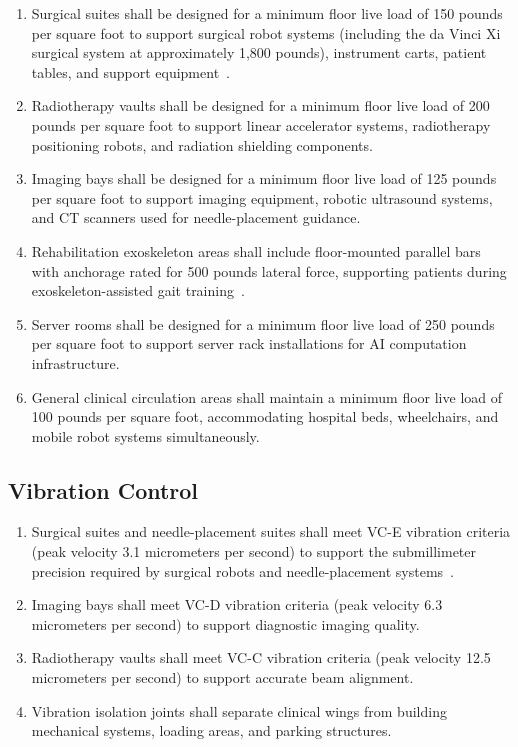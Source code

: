 \begin{enumerate}[label=(\alph*)]
\item Surgical suites shall be designed for a minimum floor live load of 150
  pounds per square foot to support surgical robot systems (including the
  da Vinci Xi surgical system at approximately 1,800 pounds), instrument carts,
  patient tables, and support equipment~\cite{patientinstructions2026}.

\item Radiotherapy vaults shall be designed for a minimum floor live load of
  200 pounds per square foot to support linear accelerator systems,
  radiotherapy positioning robots, and radiation shielding components.

\item Imaging bays shall be designed for a minimum floor live load of 125
  pounds per square foot to support imaging equipment, robotic ultrasound
  systems, and CT scanners used for needle-placement guidance.

\item Rehabilitation exoskeleton areas shall include floor-mounted parallel
  bars with anchorage rated for 500 pounds lateral force, supporting patients
  during exoskeleton-assisted gait
  training~\cite{patientinstructions2026}.

\item Server rooms shall be designed for a minimum floor live load of 250
  pounds per square foot to support server rack installations for AI
  computation infrastructure.

\item General clinical circulation areas shall maintain a minimum floor live
  load of 100 pounds per square foot, accommodating hospital beds,
  wheelchairs, and mobile robot systems simultaneously.
\end{enumerate}

\subsection{Vibration Control}

\begin{enumerate}[label=(\alph*)]
\item Surgical suites and needle-placement suites shall meet VC-E vibration
  criteria (peak velocity 3.1 micrometers per second) to support the
  submillimeter precision required by surgical robots and needle-placement
  systems~\cite{newtrial2026}.

\item Imaging bays shall meet VC-D vibration criteria (peak velocity 6.3
  micrometers per second) to support diagnostic imaging quality.

\item Radiotherapy vaults shall meet VC-C vibration criteria (peak velocity
  12.5 micrometers per second) to support accurate beam alignment.

\item Vibration isolation joints shall separate clinical wings from building
  mechanical systems, loading areas, and parking structures.
\end{enumerate}

